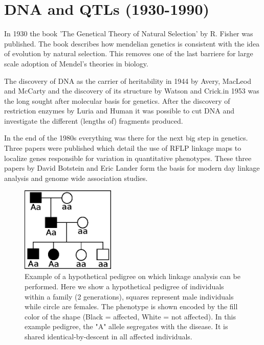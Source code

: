 \section{DNA and QTLs (1930-1990)}
In 1930 the book 'The Genetical Theory of Natural Selection' \cite{Fisher:1930} by R. 
Fisher was published. The book describes how mendelian genetics is consistent with the 
idea of evolution by natural selection. This removes one of the last barriere for large 
scale adoption of Mendel's theories in biology.

The discovery of DNA as the carrier of heritability in 1944 by Avery, MacLeod and McCarty 
\cite{Avery:1944} and the discovery of its structure by Watson and Crick.in 1953 
\cite{Watson:1953} was the long sought after molecular basis for genetics. After the 
discovery of restriction enzymes by Luria and Human \cite{Luria:1952} it was possible 
to cut DNA and investigate the different (lengths of) fragments produced.

In the end of the 1980s everything was there for the next big step in genetics. Three 
papers were published which detail the use of RFLP linkage maps to localize genes 
responsible for variation in quantitative phenotypes. These three papers by David Botstein 
and Eric Lander \cite{Lander:1986, Lander:1987, Lander:1989} form the basis for modern 
day linkage analysis and genome wide association studies. 

\begin{figure}
  \centering
  \includegraphics[width=0.4\textwidth]{eps/image_1_2.eps}
  \caption[Example of pedigree based linkage analysis.]
    {Example of a hypothetical pedigree on which linkage analysis can be performed. Here we show a 
    hypothetical pedigree of individuals within a family (2 generations), squares represent 
    male individuals while circle are females. The phenotype is shown encoded by the fill 
    color of the shape (Black = affected, White = not affected).  In this example pedigree, 
    the "A" allele segregates with the disease. It is shared identical-by-descent in all 
    affected individuals. }
    \label{fig:pedigree}
\end{figure}

